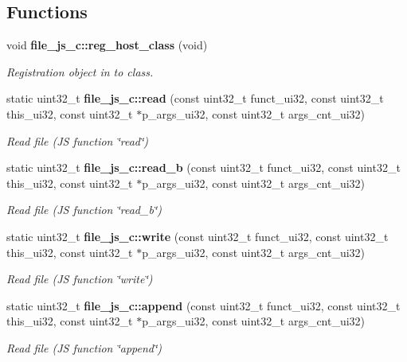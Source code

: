 \subsection*{Functions}
\begin{DoxyCompactItemize}
\item 
void \textbf{ file\+\_\+js\+\_\+c\+::reg\+\_\+host\+\_\+class} (void)
\begin{DoxyCompactList}\small\item\em Registration object in to class. \end{DoxyCompactList}\item 
static uint32\+\_\+t \textbf{ file\+\_\+js\+\_\+c\+::read} (const uint32\+\_\+t funct\+\_\+ui32, const uint32\+\_\+t this\+\_\+ui32, const uint32\+\_\+t $\ast$p\+\_\+args\+\_\+ui32, const uint32\+\_\+t args\+\_\+cnt\+\_\+ui32)
\begin{DoxyCompactList}\small\item\em Read file (JS function \char`\"{}read\char`\"{}) \end{DoxyCompactList}\item 
static uint32\+\_\+t \textbf{ file\+\_\+js\+\_\+c\+::read\+\_\+b} (const uint32\+\_\+t funct\+\_\+ui32, const uint32\+\_\+t this\+\_\+ui32, const uint32\+\_\+t $\ast$p\+\_\+args\+\_\+ui32, const uint32\+\_\+t args\+\_\+cnt\+\_\+ui32)
\begin{DoxyCompactList}\small\item\em Read file (JS function \char`\"{}read\+\_\+b\char`\"{}) \end{DoxyCompactList}\item 
static uint32\+\_\+t \textbf{ file\+\_\+js\+\_\+c\+::write} (const uint32\+\_\+t funct\+\_\+ui32, const uint32\+\_\+t this\+\_\+ui32, const uint32\+\_\+t $\ast$p\+\_\+args\+\_\+ui32, const uint32\+\_\+t args\+\_\+cnt\+\_\+ui32)
\begin{DoxyCompactList}\small\item\em Read file (JS function \char`\"{}write\char`\"{}) \end{DoxyCompactList}\item 
static uint32\+\_\+t \textbf{ file\+\_\+js\+\_\+c\+::append} (const uint32\+\_\+t funct\+\_\+ui32, const uint32\+\_\+t this\+\_\+ui32, const uint32\+\_\+t $\ast$p\+\_\+args\+\_\+ui32, const uint32\+\_\+t args\+\_\+cnt\+\_\+ui32)
\begin{DoxyCompactList}\small\item\em Read file (JS function \char`\"{}append\char`\"{}) \end{DoxyCompactList}\end{DoxyCompactItemize}


